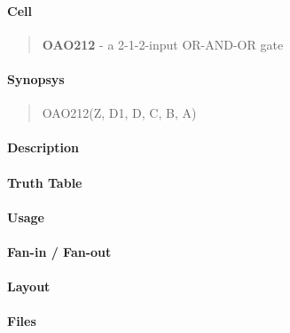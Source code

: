 \label{OAO212}
\paragraph{Cell}
\begin{quote}
    \textbf{OAO212} - a 2-1-2-input OR-AND-OR gate
\end{quote}

\paragraph{Synopsys}
\begin{quote}
    OAO212(Z, D1, D, C, B, A)
\end{quote}

\paragraph{Description}

%

\paragraph{Truth Table}
%

\paragraph{Usage}

\paragraph{Fan-in / Fan-out}

\paragraph{Layout}

\paragraph{Files}
